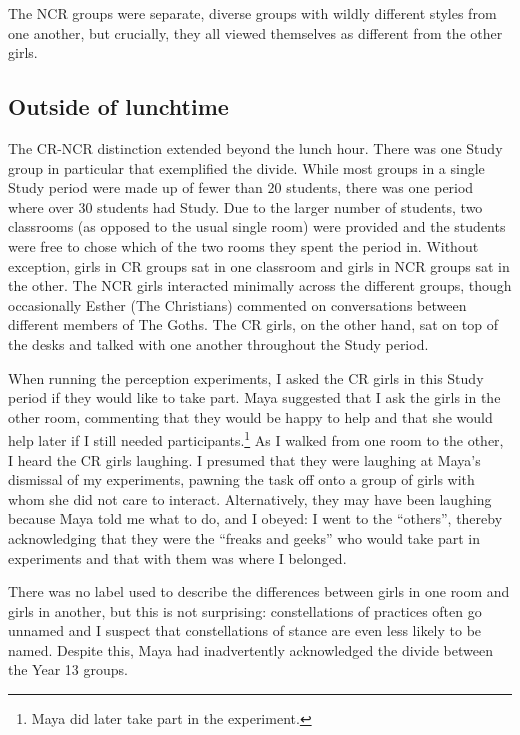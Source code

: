 \noindent  The NCR groups were separate, diverse groups with wildly different styles from one another, but crucially, they all viewed themselves as different from the other girls.  


\subsection{Outside of lunchtime}

The CR-NCR distinction extended beyond the lunch hour.  There was one Study group in particular that exemplified the divide.  While most groups in a single Study period were made up of fewer than 20 students, there was one period where over 30 students had Study.  Due to the larger number of students, two classrooms (as opposed to the usual single room) were provided and the students were free to chose which of the two rooms they spent the period in.  Without exception, girls in CR groups sat in one classroom and girls in NCR groups sat in the other.  The NCR girls interacted minimally across the different groups, though occasionally Esther (The Christians) commented on conversations between different members of The Goths.  The CR girls, on the other hand, sat on top of the desks and talked with one another throughout the Study period.

When running the perception experiments, I asked the CR girls in this Study period if they would like to take part.  Maya suggested that I ask the girls in the other room, commenting that they would be happy to help and that she would help later if I still needed participants.\footnote{Maya did later take part in the experiment.}  As I walked from one room to the other, I heard the CR girls laughing.  I presumed that they were laughing at Maya's dismissal of my experiments, pawning the task off onto a group of girls with whom she did not care to interact.  Alternatively, they may have been laughing because Maya told me what to do, and I obeyed: I went to the ``others'', thereby acknowledging that they were the ``freaks and geeks'' who would take part in experiments and that with them was where I belonged.  

There was no label used to describe the differences between girls in one room and girls in another, but this is not surprising: constellations of practices often go unnamed \cite[128]{wenger1998} and I suspect that constellations of stance are even less likely to be named.  Despite this, Maya had inadvertently acknowledged the divide between the Year 13 groups.



